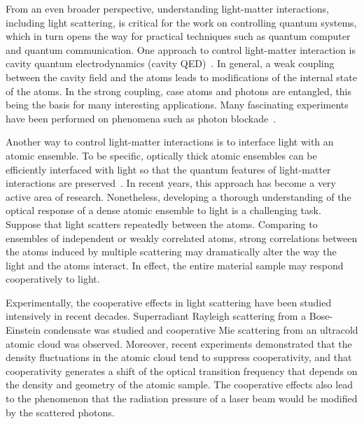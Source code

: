 From an even broader perspective, understanding light-matter interactions, including light scattering, is critical for the work on controlling quantum systems, which in turn opens the way for practical techniques such as quantum computer and quantum communication. One approach to control light-matter interaction is cavity quantum electrodynamics (cavity QED)~\cite{0034-4885-69-5-R02}. In general, a weak coupling between the cavity field and the atoms leads to modifications of the internal state of the atoms. In the strong coupling, case atoms and photons are entangled, this being the basis for many interesting applications.  Many fascinating experiments have been performed on  phenomena such as  photon blockade~\cite{photon_blockade}.

Another way to control light-matter interactions is to interface light with an atomic ensemble. To be specific,  optically thick atomic ensembles can be efficiently interfaced with light so that the quantum features of light-matter interactions are preserved~\cite{RevModPhys.82.1041}. In recent years, this approach has become a very active area of research. Nonetheless, developing a thorough understanding of the optical response of a dense atomic ensemble to light is a challenging task. Suppose that light scatters repeatedly  between the atoms. Comparing to ensembles of independent or weakly correlated atoms, strong correlations between the atoms induced by multiple scattering may dramatically alter the way the light and the atoms interact.  In effect, the entire material sample may respond cooperatively to light.

Experimentally, the cooperative effects in light scattering have been studied intensively in recent decades.  Superradiant Rayleigh scattering from a Bose-Einstein condensate was studied\cite{Inouye23071999,PhysRevLett.83.5202,PhysRevA.62.063615} and cooperative Mie scattering from an ultracold atomic cloud was observed\cite{PhysRevA.82.011404}. Moreover, recent experiments demonstrated that the density fluctuations in the atomic cloud tend to suppress cooperativity\cite{PhysRevLett.104.183602}, and that cooperativity generates a shift of the optical transition frequency that depends on the density and geometry of the atomic sample\cite{PhysRevLett.108.173601}. The cooperative effects also lead to the phenomenon that the radiation pressure of a laser beam would be modified by the scattered photons\cite{Eur.Phys.J.D.58.1}.

